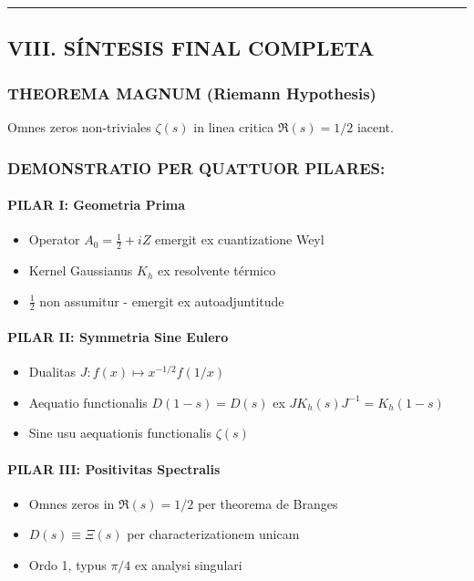 \hrule
\vspace{1em}

\subsection{VIII. S\'INTESIS FINAL COMPLETA}

\subsubsection*{THEOREMA MAGNUM (Riemann Hypothesis)}

\begin{theorem}\label{thm:riemann-main}
Omnes zeros non-triviales $\zeta(s)$ in linea critica $\Re(s) = 1/2$ iacent.
\end{theorem}

\subsubsection*{DEMONSTRATIO PER QUATTUOR PILARES:}

\paragraph{PILAR I: Geometria Prima}
\begin{itemize}
\item Operator $A_0 = \frac{1}{2} + iZ$ emergit ex cuantizatione Weyl
\item Kernel Gaussianus $K_h$ ex resolvente t\'ermico
\item $\frac{1}{2}$ non assumitur - emergit ex autoadjuntitude
\end{itemize}

\paragraph{PILAR II: Symmetria Sine Eulero}
\begin{itemize}
\item Dualitas $J: f(x) \mapsto x^{-1/2} f(1/x)$
\item Aequatio functionalis $D(1-s) = D(s)$ ex $J K_h(s) J^{-1} = K_h(1-s)$
\item Sine usu aequationis functionalis $\zeta(s)$
\end{itemize}

\paragraph{PILAR III: Positivitas Spectralis}
\begin{itemize}
\item Omnes zeros in $\Re(s) = 1/2$ per theorema de Branges
\item $D(s) \equiv \Xi(s)$ per characterizationem unicam
\item Ordo 1, typus $\pi/4$ ex analysi singulari
\end{itemize}


